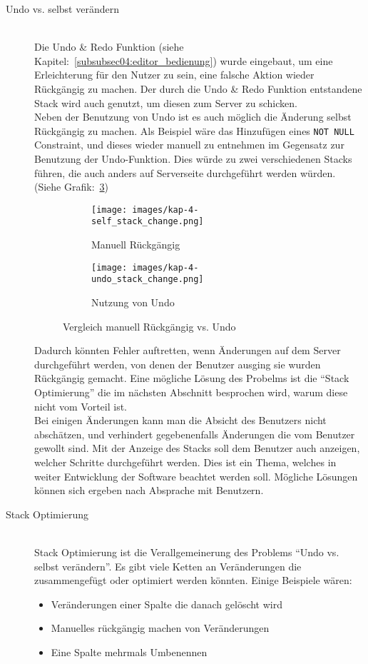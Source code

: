 \begin{description}
\item[Undo vs. selbst verändern] \hfill\\
Die Undo \& Redo Funktion (siehe Kapitel:~\ref{subsubsec04:editor_bedienung}) wurde eingebaut, um eine Erleichterung für den Nutzer zu sein, eine falsche Aktion wieder Rückgängig zu machen. Der durch die Undo \& Redo Funktion entstandene Stack wird auch genutzt, um diesen zum Server zu schicken. \\
Neben der Benutzung von Undo ist es auch möglich die Änderung selbst Rückgängig zu machen. Als Beispiel wäre das Hinzufügen eines \texttt{NOT NULL} Constraint, und dieses wieder manuell zu entnehmen im Gegensatz zur Benutzung der Undo-Funktion. 
Dies würde zu zwei verschiedenen Stacks führen, die auch anders auf Serverseite durchgeführt werden würden. (Siehe Grafik:~\ref{fig:self_vs_undo})%

\begin{figure}[h]
  \begin{subfigure}[b]{0.45\textwidth}
    \texttt{[image: images/kap-4-self\_stack\_change.png]}
    \caption{Manuell Rückgängig}
    \label{fig:stack_self}
  \end{subfigure}\hfill
  \begin{subfigure}[b]{0.45\textwidth}
    \texttt{[image: images/kap-4-undo\_stack\_change.png]}
    \caption{Nutzung von Undo}
    \label{fig:stack_undo}
  \end{subfigure}
  \caption{Vergleich manuell Rückgängig vs. Undo}
  \label{fig:self_vs_undo}
\end{figure}

Dadurch könnten Fehler auftretten, wenn Änderungen auf dem Server durchgeführt werden, von denen der Benutzer ausging sie wurden Rückgängig gemacht. Eine mögliche Lösung des Probelms ist die ``Stack Optimierung'' die im nächsten Abschnitt besprochen wird, warum diese nicht vom Vorteil ist. \\
Bei einigen Änderungen kann man die Absicht des Benutzers nicht abschätzen, und verhindert gegebenenfalls Änderungen die vom Benutzer gewollt sind. Mit der Anzeige des Stacks soll dem Benutzer auch anzeigen, welcher Schritte durchgeführt werden.
Dies ist ein Thema, welches in weiter Entwicklung der Software beachtet werden soll. Mögliche Lösungen können sich ergeben nach Absprache mit Benutzern. 

\item[Stack Optimierung] \hfill\\
Stack Optimierung ist die Verallgemeinerung des Problems ``Undo vs. selbst verändern''. Es gibt viele Ketten an Veränderungen die zusammengefügt oder optimiert werden könnten. Einige Beispiele wären:
\begin{itemize}
    \item Veränderungen einer Spalte die danach gelöscht wird
    \item Manuelles rückgängig machen von Veränderungen
    \item Eine Spalte mehrmals Umbenennen
\end{itemize}


\end{description}
